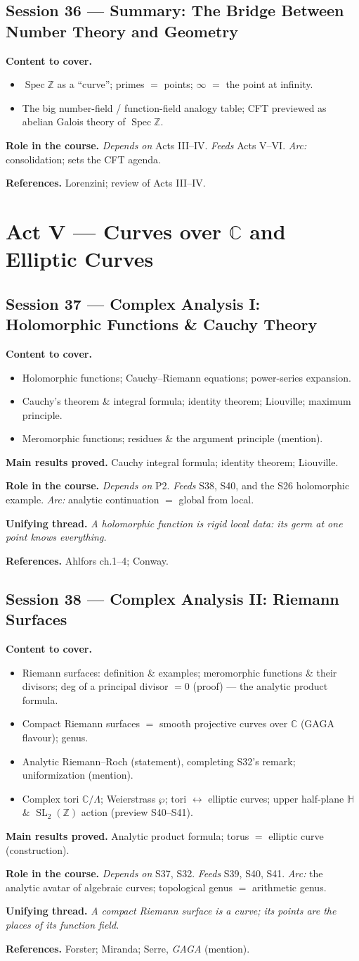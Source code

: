 \documentclass[11pt,a4paper]{article}
\newcommand{\sess}[2]{\subsection[#1. #2]{Session #1 --- #2}}
\newcommand{\chead}{\par\smallskip\noindent\textbf{Content to cover.}}
\newcommand{\proved}[1]{\par\smallskip\noindent\textbf{Main results proved.} #1}
\newcommand{\role}[1]{\par\smallskip\noindent\textbf{Role in the course.} #1}
\newcommand{\thread}[1]{\par\smallskip\noindent\textbf{Unifying thread.} \textit{#1}}
\newcommand{\srefs}[1]{\par\smallskip\noindent\textbf{References.} #1}
\newcommand{\Z}{\mathbb{Z}}
\newcommand{\C}{\mathbb{C}}
\newcommand{\HH}{\mathbb{H}}
\newcommand{\Spec}{\operatorname{Spec}}
\newcommand{\SL}{\operatorname{SL}}
\begin{document}
	\sess{36}{Summary: The Bridge Between Number Theory and Geometry}
	\chead
	\begin{itemize}
		\item $\Spec\Z$ as a ``curve''; primes $=$ points; $\infty$ $=$ the point at infinity.
		\item The big number-field / function-field analogy table; CFT previewed as abelian Galois theory of $\Spec\Z$.
	\end{itemize}
	\role{\emph{Depends on} Acts III--IV. \emph{Feeds} Acts V--VI. \emph{Arc:} consolidation; sets the CFT agenda.}
	\srefs{Lorenzini; review of Acts III--IV.}
	
	\section{Act V --- Curves over $\C$ and Elliptic Curves}
	
	\sess{37}{Complex Analysis I: Holomorphic Functions \& Cauchy Theory}
	\chead
	\begin{itemize}
		\item Holomorphic functions; Cauchy--Riemann equations; power-series expansion.
		\item Cauchy's theorem \& integral formula; identity theorem; Liouville; maximum principle.
		\item Meromorphic functions; residues \& the argument principle (mention).
	\end{itemize}
	\proved{Cauchy integral formula; identity theorem; Liouville.}
	\role{\emph{Depends on} P2. \emph{Feeds} S38, S40, and the S26 holomorphic example. \emph{Arc:} analytic continuation $=$ global from local.}
	\thread{A holomorphic function is rigid local data: its germ at one point knows everything.}
	\srefs{Ahlfors ch.1--4; Conway.}
	
	\sess{38}{Complex Analysis II: Riemann Surfaces}
	\chead
	\begin{itemize}
		\item Riemann surfaces: definition \& examples; meromorphic functions \& their divisors; deg of a principal divisor $=0$ (proof) --- the analytic product formula.
		\item Compact Riemann surfaces $=$ smooth projective curves over $\C$ (GAGA flavour); genus.
		\item Analytic Riemann--Roch (statement), completing S32's remark; uniformization (mention).
		\item Complex tori $\C/\Lambda$; Weierstrass $\wp$; tori $\leftrightarrow$ elliptic curves; upper half-plane $\HH$ \& $\SL_2(\Z)$ action (preview S40--S41).
	\end{itemize}
	\proved{Analytic product formula; torus $=$ elliptic curve (construction).}
	\role{\emph{Depends on} S37, S32. \emph{Feeds} S39, S40, S41. \emph{Arc:} the analytic avatar of algebraic curves; topological genus $=$ arithmetic genus.}
	\thread{A compact Riemann surface is a curve; its points are the places of its function field.}
	\srefs{Forster; Miranda; Serre, \emph{GAGA} (mention).}
	
\end{document}
